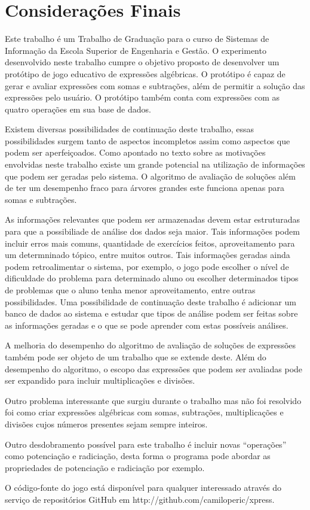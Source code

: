 \part{Considerações Finais}
Este trabalho é um Trabalho de Graduação para o curso de Sistemas de Informação da Escola Superior de Engenharia e Gestão. O experimento desenvolvido neste trabalho cumpre o objetivo proposto de desenvolver um protótipo de jogo educativo de expressões algébricas. O protótipo é capaz de gerar e avaliar expressões com somas e subtrações, além de permitir a solução das expressões pelo usuário. O protótipo também conta com expressões com as quatro operações em sua base de dados.

Existem diversas possibilidades de continuação deste trabalho, essas possibilidades surgem tanto de aspectos incompletos assim como aspectos que podem ser aperfeiçoados. Como apontado no texto sobre as motivações envolvidas neste trabalho existe um grande potencial na utilização de informações que podem ser geradas pelo sistema. O algoritmo de avaliação de soluções além de ter um desempenho fraco para árvores grandes este funciona apenas para somas e subtrações.

 	As informações relevantes que podem ser armazenadas devem estar estruturadas para que a possibiliade de análise dos dados seja maior. Tais informações podem incluir erros mais comuns, quantidade de exercícios feitos, aproveitamento para um determninado tópico, entre muitos outros. Tais informações geradas ainda podem retroalimentar o sistema, por exemplo, o jogo pode escolher o  nível de dificuldade do problema para determinado aluno ou escolher determinados tipos de problemas que o aluno tenha menor aproveitamento, entre outras possibilidades. %
Uma possibilidade de continuação deste trabalho é adicionar um banco de dados ao sistema e estudar que tipos de análise podem ser feitas sobre as informações geradas e o que se pode aprender com estas possíveis análises.

A melhoria do desempenho do algoritmo de avaliação de soluções de expressões também pode ser objeto de um trabalho que se extende deste. Além do desempenho do algoritmo, o escopo das expressões que podem ser avaliadas pode ser expandido para incluir multiplicações e divisões.

Outro problema interessante que surgiu durante o trabalho mas não foi resolvido foi como criar expressões algébricas com somas, subtrações, multiplicações e divisões cujos números presentes sejam sempre inteiros.

Outro desdobramento possível para este trabalho é incluir novas “operações” como potenciação e radiciação, desta forma o programa pode abordar as propriedades de potenciação e radiciação por exemplo.

O código-fonte do jogo está disponível para qualquer interessado através do serviço de repositórios GitHub em http://github.com/camiloperic/xpress.
